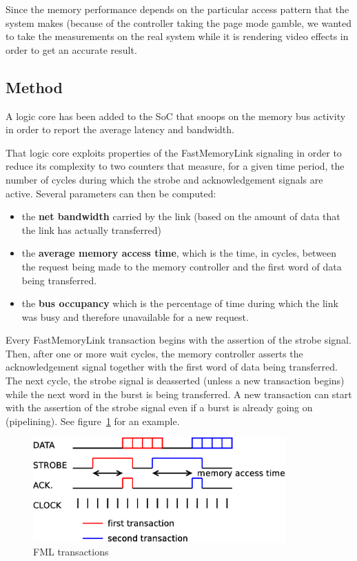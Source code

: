 \documentclass[a4paper,11pt]{kthesis}
\begin{document}
Since the memory performance depends on the particular access pattern that the system makes (because of the controller taking the page mode gamble, we wanted to take the measurements on the real system while it is rendering video effects in order to get an accurate result.

\subsection{Method}
A logic core has been added to the SoC that snoops on the memory bus activity in order to report the average latency and bandwidth.

That logic core exploits properties of the FastMemoryLink signaling in order to reduce its complexity to two counters that measure, for a given time period, the number of cycles during which the strobe and acknowledgement signals are active. Several parameters can then be computed:
\begin{itemize}
\item the \textbf{net bandwidth} carried by the link (based on the amount of data that the link has actually transferred)
\item the \textbf{average memory access time}, which is the time, in cycles, between the request being made to the memory controller and the first word of data being transferred.
\item the \textbf{bus occupancy} which is the percentage of time during which the link was busy and therefore unavailable for a new request.
\end{itemize}

Every FastMemoryLink transaction begins with the assertion of the strobe signal. Then, after one or more wait cycles, the memory controller asserts the acknowledgement signal together with the first word of data being transferred. The next cycle, the strobe signal is deasserted (unless a new transaction begins) while the next word in the burst is being transferred. A new transaction can start with the assertion of the strobe signal even if a burst is already going on (pipelining). See figure~\ref{fig:fmltransactions} for an example.

\begin{figure}
\centering
\includegraphics[height=40mm]{fmltransactions.eps}
\caption{FML transactions} \label{fig:fmltransactions}
\end{figure}
\end{document}
